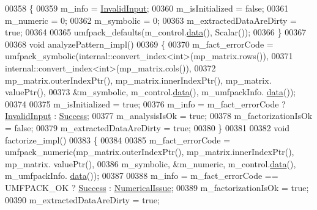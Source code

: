 \begin{DoxyCode}
00358     \{
00359       m\_info                  = \hyperlink{group__enums_gga85fad7b87587764e5cf6b513a9e0ee5ea945604f62795ffc70aedf2bd12ea0434}{InvalidInput};
00360       m\_isInitialized         = \textcolor{keyword}{false};
00361       m\_numeric               = 0;
00362       m\_symbolic              = 0;
00363       m\_extractedDataAreDirty = \textcolor{keyword}{true};
00364 
00365       umfpack\_defaults(m\_control.\hyperlink{class_eigen_1_1_plain_object_base_ac25699535374b1854cf8494e44ad31b2}{data}(), Scalar());
00366     \}
00367 
00368     \textcolor{keywordtype}{void} analyzePattern\_impl()
00369     \{
00370       m\_fact\_errorCode = umfpack\_symbolic(internal::convert\_index<int>(mp\_matrix.rows()),
00371                                           internal::convert\_index<int>(mp\_matrix.cols()),
00372                                           mp\_matrix.outerIndexPtr(), mp\_matrix.innerIndexPtr(), mp\_matrix.
      valuePtr(),
00373                                           &m\_symbolic, m\_control.\hyperlink{class_eigen_1_1_plain_object_base_ac25699535374b1854cf8494e44ad31b2}{data}(), m\_umfpackInfo.
      \hyperlink{class_eigen_1_1_plain_object_base_ac25699535374b1854cf8494e44ad31b2}{data}());
00374 
00375       m\_isInitialized = \textcolor{keyword}{true};
00376       m\_info = m\_fact\_errorCode ? \hyperlink{group__enums_gga85fad7b87587764e5cf6b513a9e0ee5ea945604f62795ffc70aedf2bd12ea0434}{InvalidInput} : \hyperlink{group__enums_gga85fad7b87587764e5cf6b513a9e0ee5ea52581b035f4b59c203b8ff999ef5fcea}{Success};
00377       m\_analysisIsOk = \textcolor{keyword}{true};
00378       m\_factorizationIsOk = \textcolor{keyword}{false};
00379       m\_extractedDataAreDirty = \textcolor{keyword}{true};
00380     \}
00381 
00382     \textcolor{keywordtype}{void} factorize\_impl()
00383     \{
00384 
00385       m\_fact\_errorCode = umfpack\_numeric(mp\_matrix.outerIndexPtr(), mp\_matrix.innerIndexPtr(), mp\_matrix.
      valuePtr(),
00386                                          m\_symbolic, &m\_numeric, m\_control.\hyperlink{class_eigen_1_1_plain_object_base_ac25699535374b1854cf8494e44ad31b2}{data}(), m\_umfpackInfo.
      \hyperlink{class_eigen_1_1_plain_object_base_ac25699535374b1854cf8494e44ad31b2}{data}());
00387 
00388       m\_info = m\_fact\_errorCode == UMFPACK\_OK ? \hyperlink{group__enums_gga85fad7b87587764e5cf6b513a9e0ee5ea52581b035f4b59c203b8ff999ef5fcea}{Success} : \hyperlink{group__enums_gga85fad7b87587764e5cf6b513a9e0ee5eaaf9b736d310a664e7729d163a035cc5f}{NumericalIssue};
00389       m\_factorizationIsOk = \textcolor{keyword}{true};
00390       m\_extractedDataAreDirty = \textcolor{keyword}{true};

\end{DoxyCode}
